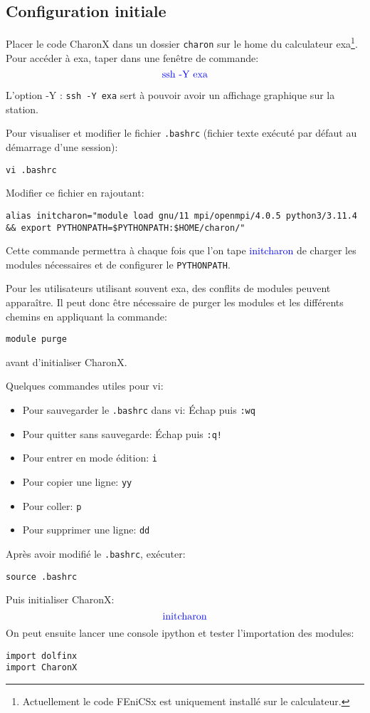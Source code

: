 \documentclass[10pt]{book}
\begin{document}
\begin{appendices}
\subsection{Configuration initiale}
Placer le code CharonX dans un dossier \texttt{charon} sur le home du calculateur exa\footnote{Actuellement le code FEniCSx est uniquement installé sur le calculateur.}. Pour accéder à exa, taper dans une fenêtre de commande:
\begin{equation}
\blue{\text{ssh -Y exa}}
\label{eq:init_exa}
\end{equation}
\begin{Rem}{L'option -Y : \texttt{ssh -Y exa} sert à pouvoir avoir un affichage graphique sur la station.}\end{Rem}
Pour visualiser et modifier le fichier \texttt{.bashrc} (fichier texte exécuté par défaut au démarrage d'une session):
\begin{center}
\texttt{vi .bashrc}
\end{center}
Modifier ce fichier en rajoutant:
\begin{center}
\texttt{alias initcharon="module load gnu/11 mpi/openmpi/4.0.5 python3/3.11.4 \&\& export PYTHONPATH=\$PYTHONPATH:\${HOME}/charon/"}
\end{center}
Cette commande permettra à chaque fois que l'on tape \textcolor{blue}{initcharon} de charger les modules nécessaires et de configurer le \texttt{PYTHONPATH}.
\begin{Rem}{Pour les utilisateurs utilisant souvent exa, des conflits de modules peuvent apparaître. Il peut donc être nécessaire de purger les modules et les différents chemins en appliquant la commande:
\begin{center}
\texttt{module purge}
\end{center}
avant d'initialiser CharonX.
}\end{Rem}
Quelques commandes utiles pour vi:
\begin{itemize}
\item Pour sauvegarder le \texttt{.bashrc} dans vi: Échap puis \texttt{:wq}
\item Pour quitter sans sauvegarde: Échap puis \texttt{:q!}
\item Pour entrer en mode édition: \texttt{i}
\item Pour copier une ligne: \texttt{yy}
\item Pour coller: \texttt{p}
\item Pour supprimer une ligne: \texttt{dd}
\end{itemize}
Après avoir modifié le \texttt{.bashrc}, exécuter:
\begin{center}
\texttt{source .bashrc}
\end{center}
Puis initialiser CharonX:
\begin{equation}
\blue{\text{initcharon}}
\label{eq:init_charon}
\end{equation}
On peut ensuite lancer une console ipython et tester l'importation des modules:
\begin{verbatim}
import dolfinx
import CharonX
\end{verbatim}

\end{appendices}
\end{document}
